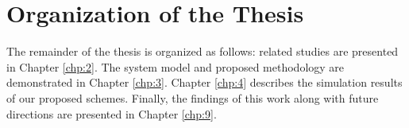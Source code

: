     




\section{Organization of the Thesis}\hypertarget{organization of thesis}{}
The remainder of the thesis is organized as follows: related studies are presented in Chapter \ref{chp:2}. The system model and proposed methodology are demonstrated in Chapter \ref{chp:3}. Chapter \ref{chp:4} describes the simulation results of our proposed schemes. Finally, the findings of this work along with future directions are presented in Chapter \ref{chp:9}.




\clearpage
